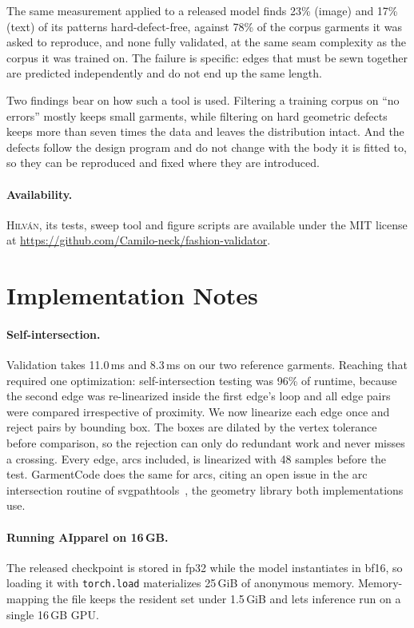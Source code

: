 \documentclass[10pt,twocolumn]{article}
\newcommand{\hilvan}{\textsc{Hilv\'an}}
\newcommand{\code}[1]{\texttt{\small #1}}
\begin{document}
The same measurement applied to a released model finds 23\% (image) and 17\%
(text) of its patterns hard-defect-free, against 78\% of the corpus garments
it was asked to reproduce, and none fully validated, at the same seam
complexity as the corpus it was trained on. The failure is specific: edges
that must be sewn together are predicted independently and do not end up the
same length.

Two findings bear on how such a tool is used. Filtering a training corpus on
``no errors'' mostly keeps small garments, while filtering on hard geometric
defects keeps more than seven times the data and leaves the distribution
intact. And the defects follow the design program and do not change with the
body it is fitted to, so they can be reproduced and fixed where they are
introduced.



\paragraph{Availability.} \hilvan, its tests, sweep tool and figure scripts are
available under the MIT license at
\url{https://github.com/Camilo-neck/fashion-validator}.




\appendix
\section{Implementation Notes}
\label{app:impl}

\paragraph{Self-intersection.} Validation takes 11.0\,ms and 8.3\,ms on our two
reference garments. Reaching that required one optimization:
self-intersection testing was 96\% of runtime, because the second edge was
re-linearized inside the first edge's loop and all edge pairs were compared
irrespective of proximity. We now linearize each edge once and reject pairs by
bounding box. The boxes are dilated by the vertex tolerance before comparison,
so the rejection can only do redundant work and never misses a crossing.
Every edge, arcs included, is linearized with 48 samples before the test.
GarmentCode does the same for arcs, citing an open issue in the arc
intersection routine of svgpathtools~\citep{svgpathtools121}, the geometry
library both implementations use.


\paragraph{Running AIpparel on 16\,GB.} The released checkpoint is stored in
fp32 while the model instantiates in bf16, so loading it with
\code{torch.load} materializes 25\,GiB of anonymous memory. Memory-mapping the
file keeps the resident set under 1.5\,GiB and lets inference run on a single
16\,GB GPU.
\end{document}
